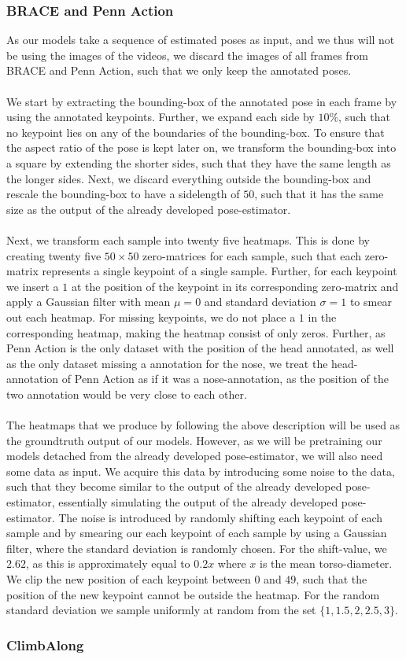 \documentclass[./main.tex]{subfiles}
\begin{document}
\subsubsection{BRACE and Penn Action}
As our models take a sequence of estimated poses as input, and we thus will not be using the images of the videos, we discard the images of all frames from BRACE and Penn Action, such that we only keep the annotated poses.
\\
\\
We start by extracting the bounding-box of the annotated pose in each frame by using the annotated keypoints. Further, we expand each side by $10\%$, such that no keypoint lies on any of the boundaries of the bounding-box. To ensure that the aspect ratio of the pose is kept later on, we transform the bounding-box into a square by extending the shorter sides, such that they have the same length as the longer sides. Next, we discard everything outside the bounding-box and rescale the bounding-box to have a sidelength of $50$, such that it has the same size as the output of the already developed pose-estimator.
\\
\\
Next, we transform each sample into twenty five heatmaps. This is done by creating twenty five $50 \times 50$ zero-matrices for each sample, such that each zero-matrix represents a single keypoint of a single sample. Further, for each keypoint we insert a $1$ at the position of the keypoint in its corresponding zero-matrix and apply a Gaussian filter with mean $\mu = 0$ and standard deviation $\sigma = 1$ to smear out each heatmap. For missing keypoints, we do not place a $1$ in the corresponding heatmap, making the heatmap consist of only zeros. Further, as Penn Action is the only dataset with the position of the head annotated, as well as the only dataset missing a annotation for the nose, we treat the head-annotation of Penn Action as if it was a nose-annotation, as the position of the two annotation would be very close to each other.
\\
\\
The heatmaps that we produce by following the above description will be used as the groundtruth output of our models. However, as we will be pretraining our models detached from the already developed pose-estimator, we will also need some data as input. We acquire this data by introducing some noise to the data, such that they become similar to the output of the already developed pose-estimator, essentially simulating the output of the already developed pose-estimator. The noise is introduced by randomly shifting each keypoint of each sample and by smearing our each keypoint of each sample by using a Gaussian filter, where the standard deviation is randomly chosen. For the shift-value, we $2.62$, as this is approximately equal to $0.2x$ where $x$ is the mean torso-diameter. We clip the new position of each keypoint between $0$ and $49$, such that the position of the new keypoint cannot be outside the heatmap. For the random standard deviation we sample uniformly at random from the set $\{1, 1.5, 2, 2.5, 3\}$.

\subsubsection{ClimbAlong}
\end{document}
